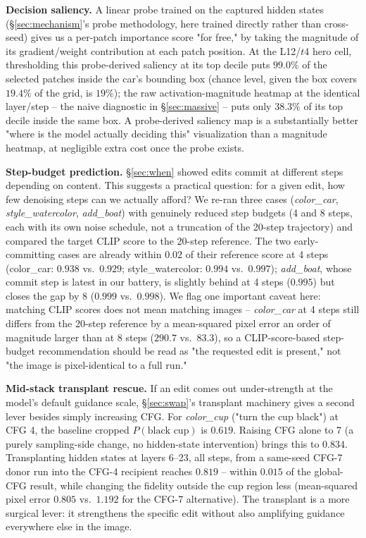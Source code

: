 \documentclass[10pt,twocolumn]{article}
\begin{document}
\textbf{Decision saliency.} A linear probe trained on the captured
hidden states (\S\ref{sec:mechanism}'s probe methodology, here trained
directly rather than cross-seed) gives us a per-patch importance score
"for free," by taking the magnitude of its gradient/weight contribution
at each patch position. At the L12/$t$4 hero cell, thresholding this
probe-derived saliency at its top decile puts $99.0\%$ of the selected
patches inside the car's bounding box (chance level, given the box
covers $19.4\%$ of the grid, is $19\%$); the raw activation-magnitude
heatmap at the identical layer/step -- the naive diagnostic in
\S\ref{sec:massive} -- puts only $38.3\%$ of its top decile inside the
same box. A probe-derived saliency map is a substantially better "where
is the model actually deciding this" visualization than a magnitude
heatmap, at negligible extra cost once the probe exists.

\textbf{Step-budget prediction.} \S\ref{sec:when} showed edits commit at
different steps depending on content. This suggests a practical
question: for a given edit, how few denoising steps can we actually
afford? We re-ran three cases (\emph{color\_car}, \emph{style\_watercolor},
\emph{add\_boat}) with genuinely reduced step budgets (4 and 8 steps,
each with its own noise schedule, not a truncation of the 20-step
trajectory) and compared the target CLIP score to the 20-step
reference. The two early-committing cases are already within $0.02$ of
their reference score at 4 steps (color\_car: $0.938$ vs.\ $0.929$;
style\_watercolor: $0.994$ vs.\ $0.997$); \emph{add\_boat}, whose
commit step is latest in our battery, is slightly behind at 4 steps
($0.995$) but closes the gap by 8 ($0.999$ vs.\ $0.998$). We flag one
important caveat here: matching CLIP scores does not mean matching
images -- \emph{color\_car} at 4 steps still differs from the 20-step
reference by a mean-squared pixel error an order of magnitude larger
than at 8 steps ($290.7$ vs.\ $83.3$), so a CLIP-score-based step-budget
recommendation should be read as "the requested edit is present," not
"the image is pixel-identical to a full run."

\textbf{Mid-stack transplant rescue.} If an edit comes out under-strength
at the model's default guidance scale, \S\ref{sec:swap}'s transplant
machinery gives a second lever besides simply increasing CFG. For
\emph{color\_cup} ("turn the cup black") at CFG 4, the baseline cropped
$P(\text{black cup})$ is $0.619$. Raising CFG alone to 7 (a purely
sampling-side change, no hidden-state intervention) brings this to
$0.834$. Transplanting hidden states at layers 6--23, all steps, from a
same-seed CFG-7 donor run into the CFG-4 recipient reaches $0.819$ --
within $0.015$ of the global-CFG result, while changing the fidelity
outside the cup region less (mean-squared pixel error $0.805$ vs.\
$1.192$ for the CFG-7 alternative). The transplant is a more surgical
lever: it strengthens the specific edit without also amplifying
guidance everywhere else in the image.
\end{document}
